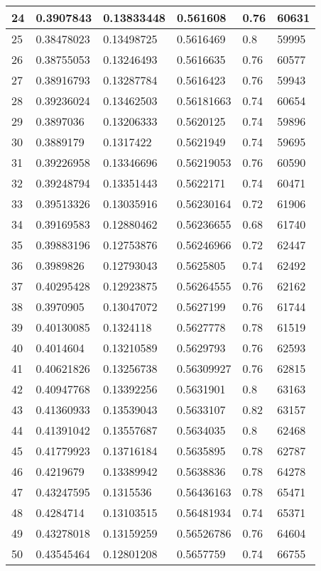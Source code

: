\begin{longtable}{|l|l|l|l|l|l|}
24 & 0.3907843 & 0.13833448 & 0.561608 & 0.76 & 60631 \\ \hline 
25 & 0.38478023 & 0.13498725 & 0.5616469 & 0.8 & 59995 \\ \hline 
26 & 0.38755053 & 0.13246493 & 0.5616635 & 0.76 & 60577 \\ \hline 
27 & 0.38916793 & 0.13287784 & 0.5616423 & 0.76 & 59943 \\ \hline 
28 & 0.39236024 & 0.13462503 & 0.56181663 & 0.74 & 60654 \\ \hline 
29 & 0.3897036 & 0.13206333 & 0.5620125 & 0.74 & 59896 \\ \hline 
30 & 0.3889179 & 0.1317422 & 0.5621949 & 0.74 & 59695 \\ \hline 
31 & 0.39226958 & 0.13346696 & 0.56219053 & 0.76 & 60590 \\ \hline 
32 & 0.39248794 & 0.13351443 & 0.5622171 & 0.74 & 60471 \\ \hline 
33 & 0.39513326 & 0.13035916 & 0.56230164 & 0.72 & 61906 \\ \hline 
34 & 0.39169583 & 0.12880462 & 0.56236655 & 0.68 & 61740 \\ \hline 
35 & 0.39883196 & 0.12753876 & 0.56246966 & 0.72 & 62447 \\ \hline 
36 & 0.3989826 & 0.12793043 & 0.5625805 & 0.74 & 62492 \\ \hline 
37 & 0.40295428 & 0.12923875 & 0.56264555 & 0.76 & 62162 \\ \hline 
38 & 0.3970905 & 0.13047072 & 0.5627199 & 0.76 & 61744 \\ \hline 
39 & 0.40130085 & 0.1324118 & 0.5627778 & 0.78 & 61519 \\ \hline 
40 & 0.4014604 & 0.13210589 & 0.5629793 & 0.76 & 62593 \\ \hline 
41 & 0.40621826 & 0.13256738 & 0.56309927 & 0.76 & 62815 \\ \hline 
42 & 0.40947768 & 0.13392256 & 0.5631901 & 0.8 & 63163 \\ \hline 
43 & 0.41360933 & 0.13539043 & 0.5633107 & 0.82 & 63157 \\ \hline 
44 & 0.41391042 & 0.13557687 & 0.5634035 & 0.8 & 62468 \\ \hline 
45 & 0.41779923 & 0.13716184 & 0.5635895 & 0.78 & 62787 \\ \hline 
46 & 0.4219679 & 0.13389942 & 0.5638836 & 0.78 & 64278 \\ \hline 
47 & 0.43247595 & 0.1315536 & 0.56436163 & 0.78 & 65471 \\ \hline 
48 & 0.4284714 & 0.13103515 & 0.56481934 & 0.74 & 65371 \\ \hline 
49 & 0.43278018 & 0.13159259 & 0.56526786 & 0.76 & 64604 \\ \hline 
50 & 0.43545464 & 0.12801208 & 0.5657759 & 0.74 & 66755 \\ \hline 
\end{longtable}